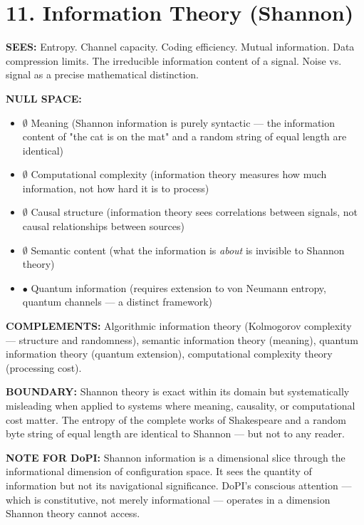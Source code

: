 \bigskip\noindent\makebox[\textwidth]{\color{rulegray}\rule{5cm}{0.3pt}}\bigskip


\section*{11. Information Theory (Shannon)}


\textbf{SEES:} Entropy. Channel capacity. Coding efficiency. Mutual information. Data compression limits. The irreducible information content of a signal. Noise vs. signal as a precise mathematical distinction.


\textbf{NULL SPACE:}

\begin{itemize}[nosep,leftmargin=*]
  \item $\emptyset$ Meaning (Shannon information is purely syntactic — the information content of "the cat is on the mat" and a random string of equal length are identical)
  \item $\emptyset$ Computational complexity (information theory measures how much information, not how hard it is to process)
  \item $\emptyset$ Causal structure (information theory sees correlations between signals, not causal relationships between sources)
  \item $\emptyset$ Semantic content (what the information is \textit{about} is invisible to Shannon theory)
  \item $\bullet$ Quantum information (requires extension to von Neumann entropy, quantum channels — a distinct framework)
\end{itemize}


\textbf{COMPLEMENTS:} Algorithmic information theory (Kolmogorov complexity — structure and randomness), semantic information theory (meaning), quantum information theory (quantum extension), computational complexity theory (processing cost).


\textbf{BOUNDARY:} Shannon theory is exact within its domain but systematically misleading when applied to systems where meaning, causality, or computational cost matter. The entropy of the complete works of Shakespeare and a random byte string of equal length are identical to Shannon — but not to any reader.


\textbf{NOTE FOR DoPI:} Shannon information is a dimensional slice through the informational dimension of configuration space. It sees the quantity of information but not its navigational significance. DoPI's conscious attention — which is constitutive, not merely informational — operates in a dimension Shannon theory cannot access.



